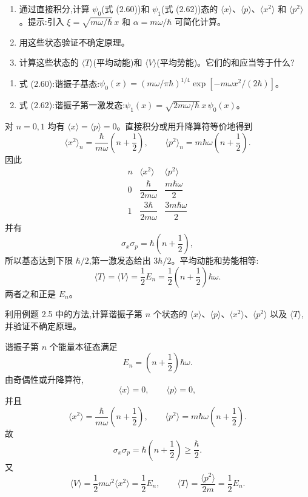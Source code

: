 \begin{question}
\begin{enumerate}
\item 通过直接积分,计算 $\psi_0$(式 (2.60))和 $\psi_1$(式 (2.62))态的 $\langle x\rangle$、$\langle p\rangle$、$\langle x^2\rangle$ 和 $\langle p^2\rangle$。提示:引入 $\xi=\sqrt{m\omega/\hbar}\,x$ 和 $\alpha=m\omega/\hbar$ 可简化计算。
\item 用这些状态验证不确定原理。
\item 计算这些状态的 $\langle T\rangle$(平均动能)和 $\langle V\rangle$(平均势能)。它们的和应当等于什么?
\end{enumerate}

\par\smallskip
{}
\begin{enumerate}[leftmargin=2.2em,itemsep=0.12em,topsep=0.12em,parsep=0pt]
\item 式 (2.60):谐振子基态:$\psi_0(x)=(m\omega/\pi\hbar)^{1/4}\exp[-m\omega x^2/(2\hbar)]$。
\item 式 (2.62):谐振子第一激发态:$\psi_1(x)=\sqrt{2m\omega/\hbar}\,x\,\psi_0(x)$。
\end{enumerate}

\end{question}
\begin{solution}
对 $n=0,1$ 均有 $\langle x\rangle=\langle p\rangle=0$。直接积分或用升降算符等价地得到
\[
\langle x^2\rangle_n=\frac{\hbar}{m\omega}\left(n+\frac12\right),
\qquad
\langle p^2\rangle_n=m\hbar\omega\left(n+\frac12\right).
\]
因此
\[
\begin{array}{c|cc}
 n&\langle x^2\rangle&\langle p^2\rangle\\ \hline
0&\dfrac{\hbar}{2m\omega}&\dfrac{m\hbar\omega}{2}\\[0.4em]
1&\dfrac{3\hbar}{2m\omega}&\dfrac{3m\hbar\omega}{2}
\end{array}
\]
并有
\[
\sigma_x\sigma_p=\hbar\left(n+\frac12\right),
\]
所以基态达到下限 $\hbar/2$,第一激发态给出 $3\hbar/2$。平均动能和势能相等:
\[
\langle T\rangle=\langle V\rangle=\frac12 E_n
=\frac12\left(n+\frac12\right)\hbar\omega.
\]
两者之和正是 $E_n$。
\end{solution}

\begin{question}
利用例题 2.5 中的方法,计算谐振子第 $n$ 个状态的 $\langle x\rangle$、$\langle p\rangle$、$\langle x^2\rangle$、$\langle p^2\rangle$ 以及 $\langle T\rangle$,并验证不确定原理。
\end{question}
\begin{solution}
谐振子第 $n$ 个能量本征态满足
\[
E_n=\left(n+\frac12\right)\hbar\omega.
\]
由奇偶性或升降算符,
\[
\langle x\rangle=0,
\qquad
\langle p\rangle=0,
\]
并且
\[
\langle x^2\rangle=\frac{\hbar}{m\omega}\left(n+\frac12\right),
\qquad
\langle p^2\rangle=m\hbar\omega\left(n+\frac12\right).
\]
故
\[
\sigma_x\sigma_p=\hbar\left(n+\frac12\right)\ge\frac\hbar2.
\]
又
\[
\langle V\rangle=\frac12m\omega^2\langle x^2\rangle=\frac12E_n,
\qquad
\langle T\rangle=\frac{\langle p^2\rangle}{2m}=\frac12E_n.
\]
\end{solution}

